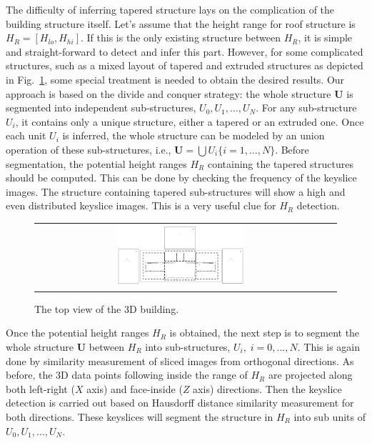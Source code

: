 \documentclass{acmsiggraph}                     %
\newcommand{\Fig}[1]{Fig.~\ref{fig:#1}}
\begin{document}
The difficulty of inferring tapered structure lays on the complication of
the building structure itself.
Let's assume that the height range for roof structure is
$H_R = [H_{lo}, H_{hi}]$.
If this is the only existing structure between $H_R$, it is simple and
straight-forward to detect and infer this part.
However, for some complicated structures, such as a mixed layout
of tapered and extruded structures as depicted in \Fig{taper_seg},
 some special treatment is needed to obtain the desired results.
Our approach is based on the divide and conquer strategy: the whole
structure $\boldsymbol{U}$ is segmented into independent sub-structures,
$U_0, U_1, \ldots, U_N$. For any sub-structure $U_i$,
it contains only a unique structure, either a tapered or an extruded one. Once
each unit $U_i$ is inferred, the whole structure can be modeled by an union operation
of these sub-structures, i.e., $\boldsymbol{U} = \bigcup{U_i\{ i = 1,\ldots,N\}}$.
Before segmentation, the potential height ranges $H_R$ containing the tapered structures should be computed.
This can be done by checking the frequency of the keyslice images.
The structure containing tapered sub-structures will show a high and even
distributed keyslice images. This is a very useful clue for $H_R$ detection.

\begin{figure}[htbp]
\begin{center}
\begin{tabular}{cc}
\includegraphics[width=0.45\textwidth]{extrude_3.png} \\
\end{tabular}
\end{center}
\caption{The top view of the 3D building. }
\label{fig:taper_seg}
\end{figure}

Once the potential height ranges $H_R$ is obtained,
the next step is to segment the whole structure $\boldsymbol{U}$ between $H_R$ into
sub-structures, $U_i, \; i = 0,\ldots,N$. This is again done by similarity measurement of sliced images
from orthogonal directions. As before, the 3D data points following inside the range of $H_R$
are projected along both left-right ($X$ axis) and face-inside ($Z$ axis) directions.
Then the keyslice detection is carried out based on Hausdorff distance similarity measurement for
both directions. These keyslices will segment the structure in $H_R$ into sub units of $U_0, U_1, \ldots, U_N$.
\end{document}
